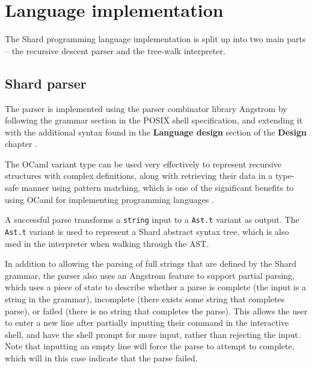 \documentclass[oneside]{report}
\begin{document}
\section{Language implementation}


The Shard programming language implementation is split up into two main parts -- the recursive descent parser and the tree-walk interpreter.

\subsection{Shard parser}

The parser is implemented using the parser combinator library Angstrom by following the grammar section in the POSIX shell specification, and extending it with the additional syntax found in the \textbf{Language design} section of the \textbf{Design} chapter \cite{ocamlangstrom} \cite{posix2017}.

The OCaml variant type can be used very effectively to represent recursive structures with complex definitions, along with retrieving their data in a type-safe manner using pattern matching, which is one of the significant benefits to using OCaml for implementing programming languages \cite{realworldocaml}.

A successful parse transforms a \texttt{string} input to a \texttt{Ast.t} variant as output. The \texttt{Ast.t} variant is used to represent a Shard abstract syntax tree, which is also used in the interpreter when walking through the AST.

In addition to allowing the parsing of full strings that are defined by the Shard grammar, the parser also uses an Angstrom feature to support partial parsing, which uses a piece of state to describe whether a parse is complete (the input is a string in the grammar), incomplete (there exists some string that completes parse), or failed (there is no string that completes the parse).
This allows the user to enter a new line after partially inputting their command in the interactive shell, and have the shell prompt for more input, rather than rejecting the input.
Note that inputting an empty line will force the parse to attempt to complete, which will in this case indicate that the parse failed.
\end{document}
